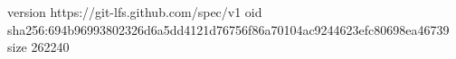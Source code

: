 version https://git-lfs.github.com/spec/v1
oid sha256:694b96993802326d6a5dd4121d76756f86a70104ac9244623efc80698ea46739
size 262240
